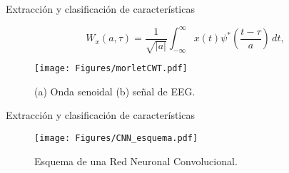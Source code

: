 \documentclass[10pt]{beamer}
\begin{document}
\begin{frame}{Extracción y clasificación de características}

\begin{equation}
W_x(a,\tau)=\frac{1}{\sqrt{|a|}} \int_{-\infty}^{\infty} x(t)\psi^{\ast}\left(\frac{t-\tau}{a}\right)\,dt,
\end{equation}

\begin{figure}[ht]
\centering
\texttt{[image: Figures/morletCWT.pdf]}
\caption{(a) Onda senoidal (b) señal de EEG.}
\label{CWT1}
\end{figure}
    
\end{frame}



\begin{frame}{Extracción y clasificación de características}
\begin{figure}[ht]
\centering
\texttt{[image: Figures/CNN\_esquema.pdf]}
\caption{Esquema de una Red Neuronal Convolucional.}
\label{CNN}
\end{figure}
\end{frame}
\end{document}
